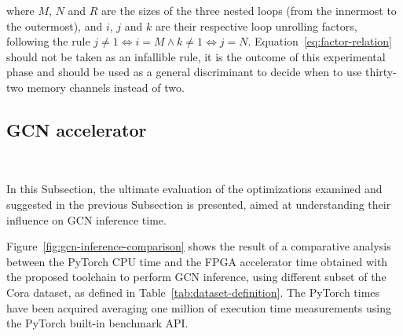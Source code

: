 \documentclass[11pt,a4paper,twocolumn]{article}
\begin{document}
where $M$, $N$ and $R$ are the sizes of the three nested loops (from the innermost to the outermost), and $i$, $j$ and $k$ are their respective loop unrolling factors, following the rule $j \neq 1 \iff i=M \land k \neq 1 \iff j=N$.
Equation~\ref{eq:factor-relation} should not be taken as an infallible rule, it is the outcome of this experimental phase and should be used as a general discriminant to decide when to use thirty-two memory channels instead of two.

\subsection{GCN accelerator}
\label{subsec:gcn-accelerator}%

\begin{table}[t]
\centering
    \\[10pt]
    \caption{Cora sub-dataset used for GCN inference}
    \label{tab:dataset-definition}
\end{table}

In this Subsection, the ultimate evaluation of the optimizations examined and suggested in the previous Subsection is presented, aimed at understanding their influence on GCN inference time.

Figure~\ref{fig:gcn-inference-comparison} shows the result of a comparative analysis between the PyTorch CPU time and the FPGA accelerator time obtained with the proposed toolchain to perform GCN inference, using different subset of the Cora dataset, as defined in Table~\ref{tab:dataset-definition}.
The PyTorch times have been acquired averaging one million of execution time measurements using the PyTorch built-in benchmark API\@.
\end{document}
